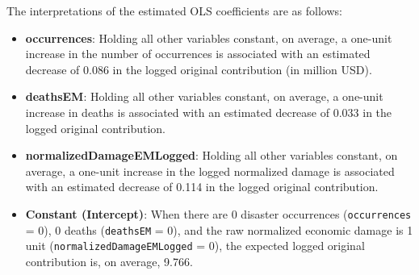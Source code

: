 \documentclass[12pt,letterpaper]{article}
\begin{document}
	The interpretations of the estimated OLS coefficients are as follows:
	\begin{itemize}
		\item \textbf{occurrences}: Holding all other variables constant, on average, a one-unit increase in the number of occurrences is associated with an estimated decrease of 0.086 in the logged original contribution (in million USD).
		\item \textbf{deathsEM}: Holding all other variables constant, on average, a one-unit increase in deaths is associated with an estimated decrease of 0.033 in the logged original contribution.
		\item \textbf{normalizedDamageEMLogged}: Holding all other variables constant, on average, a one-unit increase in the logged normalized damage is associated with an estimated decrease of 0.114 in the logged original contribution.
		\item \textbf{Constant (Intercept)}: When there are 0 disaster occurrences (\texttt{occurrences} = 0), 0 deaths (\texttt{deathsEM} = 0), and the raw normalized economic damage is 1 unit (\texttt{normalizedDamageEMLogged} = 0), the expected logged original contribution is, on average, 9.766.
	\end{itemize}
	
\end{document}
